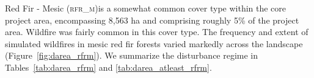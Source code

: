 Red Fir - Mesic (\textsc{rfr\_m})is a somewhat common cover type within the core project area, encompassing 8,563 ha and comprising roughly 5\% of the project area. Wildfire was fairly common in this cover type. The frequency and extent of simulated wildfires in mesic red fir forests varied markedly across the landscape (Figure~\ref{fig:darea_rfrm}). We summarize the disturbance regime in Tables~\ref{tab:darea_rfrm} and \ref{tab:darea_atleast_rfrm}.





